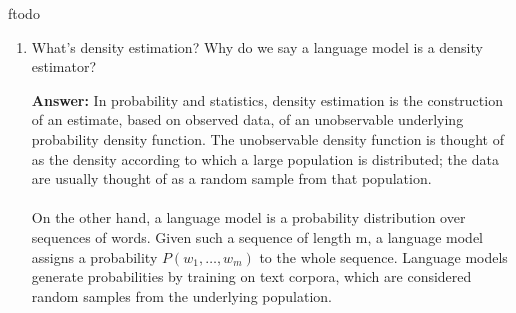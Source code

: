 ƒtodo\documentclass{article}
\newenvironment{QandA}{\begin{enumerate}[label=\arabic*.]}{\end{enumerate}}
\newenvironment{InnerQandA}{\begin{enumerate}[label=\roman*.]}{\end{enumerate}}
\newenvironment{answer}{\par\normalfont \textbf{Answer:}}{}
\begin{document}
\begin{QandA}
\begin{InnerQandA}
        \item How would you do dropouts in an RNN?
        \begin{answer}
            There are several possibilities for doing dropouts in RNNs:
            \begin{itemize}
                \item \textit{Dropout only to non-recurrent connections} -- thereby the network benefiting from regularization without sacrificing the memorization capabilities of the recurrent cells. 
                \item \textit{Variational Dropout} -- repeat the same dropout mask at each time step for both inputs, outputs and recurrent layers. 
                \item \textit{Recurrent Dropout} -- Apply dropout to the hidden state update vector, instead of the entire hidden state. 
                \item \textit{Zoneout} -- instead of setting some units’ activations to 0 as in dropout, zoneout randomly replaces some units’ activations with their activations from the previous timestep. This makes it easier for the network to preserve information from previous timesteps going forward, and facilitates, rather than hinders, the flow of gradient information going backward.
            \end{itemize}

            (See more \href{https://adriangcoder.medium.com/a-review-of-dropout-as-applied-to-rnns-72e79ecd5b7b}{here})
        \end{answer}

    \end{InnerQandA}
    \item What’s density estimation? Why do we say a language model is a density estimator?
        \begin{answer}
            In probability and statistics, density estimation is the construction of an estimate, based on observed data, of an unobservable underlying probability density function. The unobservable density function is thought of as the density according to which a large population is distributed; the data are usually thought of as a random sample from that population. \\\\
            On the other hand, a language model is a probability distribution over sequences of words. Given such a sequence of length m, a language model assigns a probability $P(w_1, \ldots, w_m)$ to the whole sequence. Language models generate probabilities by training on text corpora, which are considered random samples from the underlying population.


\end{answer}
\end{QandA}
\end{document}
